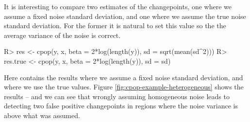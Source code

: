 \documentclass[nojss]{jss}
\begin{document}
It is interesting to compare two estimates of the changepoints, one where we assume a fixed noise standard deviation, and one where we assume the true noise standard deviation. For the former it is natural to set this value so the the average variance of the noise is correct. 
\begin{CodeChunk}
\begin{CodeInput}
R> res <- cpop(y, x, beta = 2*log(length(y)), sd = sqrt(mean(sd^2)))
R> res.true <- cpop(y, x, beta = 2*log(length(y)), sd = sd)
\end{CodeInput}
\end{CodeChunk}
Here  contains the results where we assume a fixed noise standard deviation, and  where we use the true values. Figure \ref{fig:cpop-example-heterogeneous} shows the results -- and we can see that wrongly assuming homogeneous noise leads to detecting two false positive changepoints in regions where the noise variance is above what was assumed. 

\end{document}
